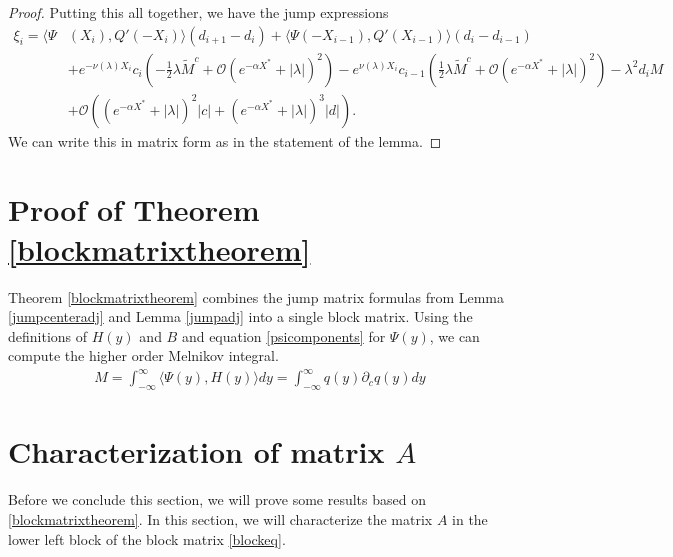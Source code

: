 \documentclass[thesis.tex]{subfiles}
\begin{document}
\begin{lemma}
\begin{proof}
Putting this all together, we have the jump expressions
\begin{align*}
\xi_i = \langle \Psi&(X_i), Q'(-X_i) \rangle (d_{i+1} - d_i ) + \langle \Psi(-X_{i-1}), Q'(X_{i-1}) \rangle (d_i - d_{i-1} ) \\
&+ e^{-\nu(\lambda)X_i}c_i\left(-\frac{1}{2}\lambda \tilde{M}^c + \mathcal{O}(e^{-\alpha X^*} +|\lambda|)^2 \right) 
- e^{\nu(\lambda)X_i}c_{i-1}\left(\frac{1}{2}\lambda \tilde{M}^c + \mathcal{O}(e^{-\alpha X^*} +|\lambda|)^2 \right)
- \lambda^2 d_i M \\
&+ \mathcal{O}\left( (e^{-\alpha X^*} + |\lambda|)^2 |c| + (e^{-\alpha X^*} + |\lambda|)^3 |d| \right).
\end{align*}
We can write this in matrix form as in the statement of the lemma.
\end{proof}
\end{lemma}

\section{Proof of Theorem \ref{blockmatrixtheorem}}

Theorem \ref{blockmatrixtheorem} combines the jump matrix formulas from Lemma \ref{jumpcenteradj} and Lemma \ref{jumpadj} into a single block matrix. Using the definitions of $H(y)$ and $B$ and equation \cref{psicomponents} for $\Psi(y)$, we can compute the higher order Melnikov integral.
\begin{align*}
M = \int_{-\infty}^\infty \langle \Psi(y), H(y) \rangle dy = \int_{-\infty}^\infty q(y) \partial_c q(y) dy
\end{align*}

\section{Characterization of matrix $A$}

Before we conclude this section, we will prove some results based on \cref{blockmatrixtheorem}. In this section, we will characterize the matrix $A$ in the lower left block of the block matrix \cref{blockeq}. 
\end{document}

